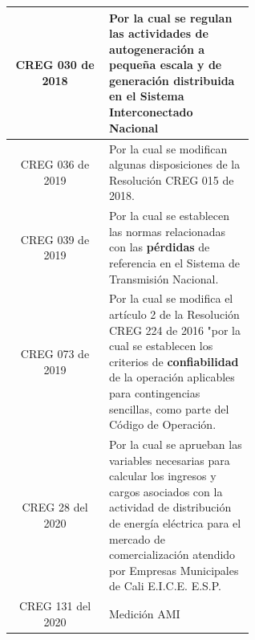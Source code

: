 \documentclass[a5paper]{book}%
\begin{document}
\begin{longtable}{|c|p{0.6\linewidth}|}
	CREG 030  de 2018 & Por la cual se regulan las actividades de
	autogeneración a pequeña escala y de generación
	distribuida en el Sistema Interconectado
	Nacional\\\hline
	
	CREG 036 de 2019& Por la cual se modifican algunas disposiciones de la
	Resolución CREG 015 de 2018.\\\hline
	
	CREG 039 de 2019& Por la cual se establecen las normas relacionadas
	con las \textbf{pérdidas} de referencia en el
	Sistema de Transmisión Nacional.\\\hline
	
	CREG 073 de 2019& Por la cual se modifica el artículo 2 de la Resolución CREG 224 de 2016 "por la cual
	se establecen los criterios de \textbf{confiabilidad} de la operación aplicables para
	contingencias sencillas, como parte del Código de Operación.\\\hline
	
	CREG 28 del 2020 & Por la cual se aprueban las variables necesarias
	para calcular los ingresos y cargos asociados con
	la actividad de distribución de energía eléctrica
	para el mercado de comercialización atendido por
	Empresas Municipales de Cali
	E.I.C.E. E.S.P.\\\hline
	
	CREG 131 del 2020 & Medición AMI \\\hline
\end{longtable}
\end{document}
